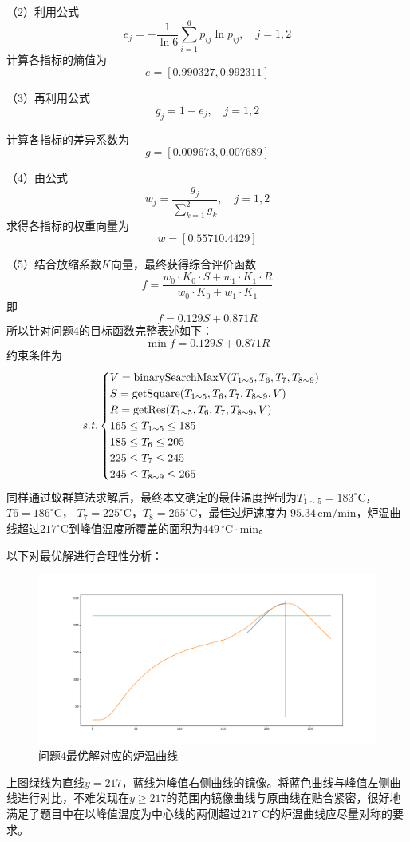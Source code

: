 \documentclass[../main.tex]{subfiles}
\begin{document}
（2）利用公式
\begin{equation}
e_{j} = - \frac{1}{ \ln 6} \sum_{i=1} ^{6} p_{ij} \ln p_{ij}, \quad j = 1 ,2
\end{equation}
计算各指标的熵值为
\[
e = [0.990327, 0.992311]
\]

（3）再利用公式
\begin{equation}
g _{j} = 1 - e_{j} , \quad j =  1, 2
\end{equation}

计算各指标的差异系数为
\[
g=[0.009673, 0.007689]
\]

（4）由公式
\begin{equation}
w_{j} = \frac{g_{j}}{\sum_{k=1}^{2} g _{k}} , \quad j = 1, 2
\end{equation}
求得各指标的权重向量为
\[
w=[0.5571   0.4429]
\]

（5）结合放缩系数\(K\)向量，最终获得综合评价函数
\[
f = \frac{w_0 \cdot K_0 \cdot S + w_1 \cdot K_1 \cdot R}{w_0 \cdot K_0 + w_1 \cdot K_1}
\]
即
\[
f=0.129 S+0.871 R
\]
所以针对问题4的目标函数完整表述如下：
\begin{equation}
\min f = 0.129 S+0.871 R
\end{equation}
约束条件为
\begin{equation}{\it s.t.}
\begin{cases}
V = \mathrm{binarySearchMaxV} (T _{1{\sim} 5}, T_{6} , T _{7},T_{8{\sim} 9})\\
S = \mathrm{getSquare} (T _{1 {\sim} 5},T _{6} , T _{7} , T _{8 {\sim} 9}, V) \\
R = \mathrm{getRes} (T _{1 {\sim} 5},T _{6} , T _{7} , T _{8 {\sim} 9}, V) \\
165 \le T_{1 {\sim} 5} \le 185\\
185 \le T _{6} \le 205 \\
225 \le T _{7} \le 245 \\
245 \le T _{8 {\sim} 9} \le 265
\end{cases}
\end{equation}
同样通过蚁群算法求解后，最终本文确定的最佳温度控制为\(T _{1 \sim 5}= 183 ^{\circ}\mathrm{C}\)，\(T6 = 186^{\circ}\mathrm{C}\)，
\(T_{7} = 225^{\circ}\mathrm{C}\)，\(T_8 = 265^{\circ}\mathrm{C}\)，最佳过炉速度为 \(95.34\,\mathrm{cm}/\mathrm{min}\)，炉温曲线超过\(217 ^{\circ}\mathrm{C}\)到峰值温度所覆盖的面积为\(449\,^{\circ}\mathrm{C} \cdot \mathrm{min}\)。

以下对最优解进行合理性分析：

\begin{figure}[H]
	\centering
	\includegraphics[scale = 0.3]{Figure_1.pdf}\caption{问题4最优解对应的炉温曲线}
\end{figure}
上图绿线为直线$y=217$，蓝线为峰值右侧曲线的镜像。将蓝色曲线与峰值左侧曲线进行对比，不难发现在$y\ge217$的范围内镜像曲线与原曲线在贴合紧密，很好地满足了题目中在以峰值温度为中心线的两侧超过\(217^{\circ}\mathrm{C}\)的炉温曲线应尽量对称的要求。
\end{document}
